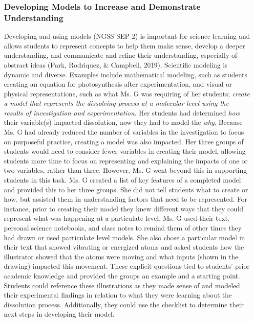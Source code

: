 \documentclass[11pt]{sig-alternate}
\begin{document}
\begin{large}
\subsubsection*{Developing Models to Increase and Demonstrate Understanding}
Developing and using models (NGSS SEP 2) is important for science learning and allows students to represent concepts to help them make sense, develop a deeper understanding, and communicate and refine their understanding, especially of abstract ideas (Park, Rodriquez, \& Campbell, 2019). Scientific modeling is dynamic and diverse. Examples include mathematical modeling, such as students creating an equation for photosynthesis after experimentation, and visual or physical representations, such as what Ms. G was requiring of her students; \textit{create a model that represents the dissolving process at a molecular level using the results of investigation and experimentation.} Her students had determined \textit{how} their variable(s) impacted dissolution, now they had to model the \textit{why}. Because Ms. G had already reduced the number of variables in the investigation to focus on purposeful practice, creating a model was also impacted. Her three groups of students would need to consider fewer variables in creating their model, allowing students more time to focus on representing and explaining the impacts of one or two variables, rather than three. However, Ms. G went beyond this in supporting students in this task. Ms. G created a list of key features of a completed model and provided this to her three groups. She did not tell students what to create or how, but assisted them in understanding factors that need to be represented. For instance, prior to creating their model they knew different ways that they could represent what was happening at a particulate level. Ms. G used their text, personal science notebooks, and class notes to remind them of other times they had drawn or used particulate level models. She also chose a particular model in their text that showed vibrating or energized atoms and asked students how the illustrator showed that the atoms were moving and what inputs (shown in the drawing) impacted this movement. These explicit questions tied to students’ prior academic knowledge and provided the groups an example and a starting point. Students could reference these illustrations as they made sense of and modeled their experimental findings in relation to what they were learning about the dissolution process. Additionally, they could use the checklist to determine their next steps in developing their model. 


\end{large}
\end{document}
